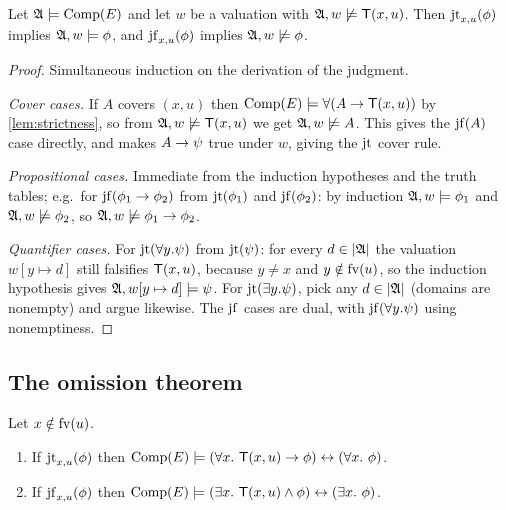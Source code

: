\begin{lemma}
  \label{lem:junk}
  Let $\AA \models \Comp$ and let $w$ be a valuation with
  $\AA, w \not\models \T(x,u)$.  Then
  $\jtx{x}{u}(\phi)$ implies $\AA, w \models \phi$, and
  $\jfx{x}{u}(\phi)$ implies $\AA, w \not\models \phi$.
\end{lemma}

\begin{proof}
  Simultaneous induction on the derivation of the judgment.

  \emph{Cover cases.}  If $A$ covers $(x,u)$ then
  $\Comp \models \forall(A \imp \T(x,u))$ by \cref{lem:strictness}, so
  from $\AA,w \not\models \T(x,u)$ we get $\AA,w \not\models A$.  This
  gives the $\jf(A)$ case directly, and makes
  $A \imp \psi$ true under $w$, giving the $\jt$ cover rule.

  \emph{Propositional cases.}  Immediate from the induction hypotheses and
  the truth tables; e.g.\ for
  $\jf(\phi_1 \imp \phi_2)$ from $\jt(\phi_1)$ and $\jf(\phi_2)$: by
  induction $\AA,w \models \phi_1$ and $\AA,w \not\models \phi_2$, so
  $\AA,w \not\models \phi_1 \imp \phi_2$.

  \emph{Quantifier cases.}  For $\jt(\forall y.\psi)$ from $\jt(\psi)$:
  for every $d \in |\AA|$ the valuation $w[y \mapsto d]$ still falsifies
  $\T(x,u)$, because $y \neq x$ and $y \notin \fv{u}$, so the induction
  hypothesis gives $\AA, w[y \mapsto d] \models \psi$.  For
  $\jt(\exists y.\psi)$, pick any $d \in |\AA|$ (domains are nonempty)
  and argue likewise.  The $\jf$ cases are dual, with
  $\jf(\forall y.\psi)$ using nonemptiness.
\end{proof}

\subsection{The omission theorem}

\begin{theorem}
  \label{thm:guard-equivalence}
  Let $x \notin \fv{u}$.
  \begin{enumerate}[label=(\roman*)]
  \item If $\jtx{x}{u}(\phi)$ then
    $\Comp \models
    (\forall x.\ \T(x,u) \imp \phi) \biimp (\forall x.\ \phi)$.
  \item If $\jfx{x}{u}(\phi)$ then
    $\Comp \models
    (\exists x.\ \T(x,u) \wedge \phi) \biimp (\exists x.\ \phi)$.
  \end{enumerate}
\end{theorem}

